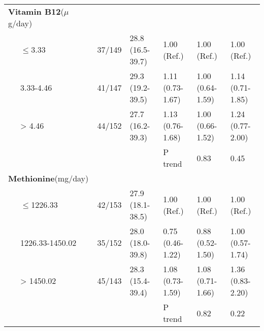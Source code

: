 \begin{landscape}
\begin{table}
\begin{adjustbox}{width=\textwidth}
\begin{tabular}{C{4cm}C{2.5cm}C{3cm}C{3cm}C{3cm}C{3cm}}
\hline
{\textbf{Vitamin B12}}{($\mu$g/day)} & ~ & ~ & ~ & ~ & ~ \\
{\ \ \ }{\textrm{${\leq}$}}{3.33} & 37/149 & 28.8 (16.5-39.7) & 1.00 (Ref.) & 1.00 (Ref.) & 1.00 (Ref.)\\
 \ \ \ 3.33-4.46 & 41/147 & 29.3 (19.2-39.5) & 1.11 (0.73-1.67) & 1.00 (0.64-1.59) & 1.14 (0.71-1.85)\\
 \ \ \ {\textgreater} 4.46 & 44/152 & 27.7 (16.2-39.3) & 1.13 (0.76-1.68) & 1.00 (0.66-1.52) & 1.24 (0.77-2.00)\\ ~ & ~ & ~ & P trend & 0.83 & 0.45\\
\hline
{\textbf{Methionine}}{(mg/day)} & ~ & ~ & ~ & ~ & ~ \\
{\ \ \ }{\textrm{${\leq}$}}{1226.33} & 42/153 & 27.9 (18.1-38.5) & 1.00 (Ref.) & 1.00 (Ref.) & 1.00 (Ref.)\\
 \ \ \ 1226.33-1450.02 & 35/152 & 28.0 (18.0-39.8) & 0.75 (0.46-1.22) & 0.88 (0.52-1.50) & 1.00 (0.57-1.74)\\
 \ \ \ {\textgreater} 1450.02 & 45/143 & 28.3 (15.4-39.4) & 1.08 (0.73-1.59) & 1.08 (0.71-1.66) & 1.36 (0.83-2.20)\\ ~ & ~ & ~ & P trend & 0.82 & 0.22\\
\hline
\end{tabular}
\end{adjustbox}
\end{table}
\end{landscape}

